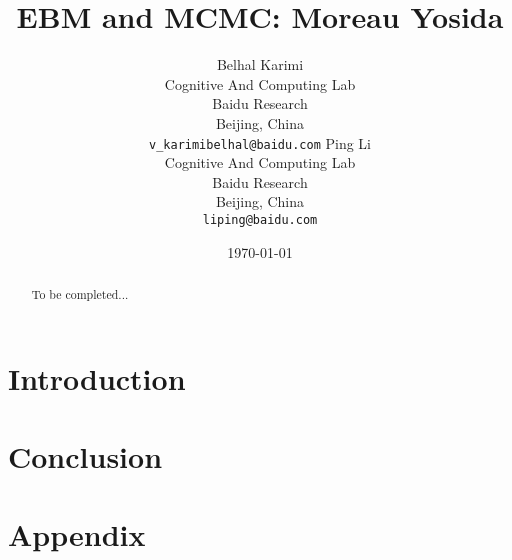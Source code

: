 \documentclass[11pt]{article}
\begin{document}
\title{EBM and MCMC: Moreau Yosida}

\author{
  Belhal Karimi \\
  Cognitive And Computing Lab\\
  Baidu Research\\
  Beijing, China \\
  \texttt{v_karimibelhal@baidu.com} 
   \And
  Ping Li \\
  Cognitive And Computing Lab\\
  Baidu Research\\
  Beijing, China \\
  \texttt{liping@baidu.com} \\
}

\date{\today}

\maketitle

\begin{abstract}
To be completed...
\end{abstract}

\section{Introduction}\label{sec:introduction}

\section{Conclusion}\label{sec:conclusion}



\newpage



\newpage
\appendix 

\section{Appendix}\label{sec:appendix}


\end{document}
